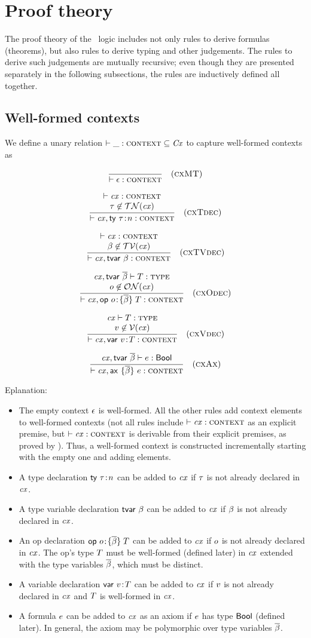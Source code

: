 \section{Proof theory}
\label{proofth}

The proof theory of the \MS\ logic includes not only rules to derive formulas
(theorems), but also rules to derive typing and other judgements. The rules to
derive such judgements are mutually recursive; even though they are presented
separately in the following subsections, the rules are inductively defined all
together.

\subsection{Well-formed contexts}
\label{wfcx-rules}

We define a unary relation $\vdash\_:\textsc{context}\subseteq\mathit{Cx}$ to capture well-formed
contexts as

\[
\frac{\begin{array}{c}\end{array}}{\vdash\epsilon:\textsc{context}}\quad\mbox{(\textsc{cxMT})}
\]

\[
\frac{\begin{array}{c}\vdash\mathit{cx}:\textsc{context}\\\tau\not\in\mathcal{TN}(\mathit{cx})\end{array}}{\vdash\mathit{cx},\mathsf{ty}\ \tau\!:\!n:\textsc{context}}\quad\mbox{(\textsc{cxTdec})}
\]

\[
\frac{\begin{array}{c}\vdash\mathit{cx}:\textsc{context}\\\beta\not\in\mathcal{TV}(\mathit{cx})\end{array}}{\vdash\mathit{cx},\mathsf{tvar}\ \beta:\textsc{context}}\quad\mbox{(\textsc{cxTVdec})}
\]

\[
\frac{\begin{array}{c}\mathit{cx},\mathsf{tvar}\ \overline{\beta}\vdash T:\textsc{type}\\o\not\in\mathcal{ON}(\mathit{cx})\end{array}}{\vdash\mathit{cx},\mathsf{op}\ o\!:\!\{\overline{\beta}\}\;T:\textsc{context}}\quad\mbox{(\textsc{cxOdec})}
\]

\[
\frac{\begin{array}{c}\mathit{cx}\vdash T:\textsc{type}\\v\not\in\mathcal{V}(\mathit{cx})\end{array}}{\vdash\mathit{cx},\mathsf{var}\ v\!:\!T:\textsc{context}}\quad\mbox{(\textsc{cxVdec})}
\]

\[
\frac{\begin{array}{c}\mathit{cx},\mathsf{tvar}\ \overline{\beta}\vdash e:\mathsf{Bool}\end{array}}{\vdash\mathit{cx},\mathsf{ax}\ \{\overline{\beta}\}\ e:\textsc{context}}\quad\mbox{(\textsc{cxAx})}
\]

Eplanation:
\begin{itemize}
\item
The empty context $\epsilon$ is well-formed. All the other rules add context
elements to well-formed contexts (not all rules include $\vdash\mathit{cx}:\textsc{context}$ as an explicit
premise, but $\vdash\mathit{cx}:\textsc{context}$ is derivable from their explicit premises, as proved by
). Thus, a well-formed context is constructed incrementally
starting with the empty one and adding elements.
\item
A type declaration $\mathsf{ty}\ \tau\!:\!n$ can be added to $\mathit{cx}$ if $\tau$ is not already
declared in $\mathit{cx}$.
\item
A type variable declaration $\mathsf{tvar}\ \beta$ can be added to $\mathit{cx}$ if $\beta$ is not
already declared in $\mathit{cx}$.
\item
An op declaration $\mathsf{op}\ o\!:\!\{\overline{\beta}\}\;T$ can be added to $\mathit{cx}$ if $o$ is not already
declared in $\mathit{cx}$. The op's type $T$ must be well-formed (defined later) in
$\mathit{cx}$ extended with the type variables $\overline{\beta}$, which must be distinct.
\item
A variable declaration $\mathsf{var}\ v\!:\!T$ can be added to $\mathit{cx}$ if $v$ is not already
declared in $\mathit{cx}$ and $T$ is well-formed in $\mathit{cx}$.
\item
A formula $e$ can be added to $\mathit{cx}$ as an axiom if $e$ has type $\mathsf{Bool}$
(defined later). In general, the axiom may be polymorphic over type variables
$\overline{\beta}$.
\end{itemize}

